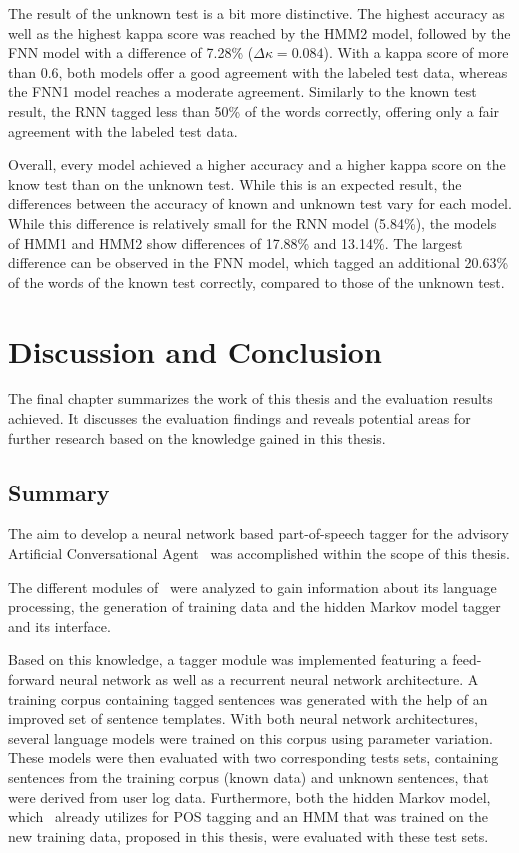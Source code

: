 The result of the unknown test is a bit more distinctive. The highest accuracy as well as the highest kappa score was reached by the HMM2 model, followed by the FNN model with a difference of 7.28\% ($\Delta\kappa=0.084$). With a kappa score of more than 0.6, both models offer a good agreement with the labeled test data, whereas the FNN1 model reaches a moderate agreement. Similarly to the known test result, the RNN tagged less than 50\% of the words correctly, offering only a fair agreement with the labeled test data.

Overall, every model achieved a higher accuracy and a higher kappa score on the know test than on the unknown test. While this is an expected result, the differences between the accuracy of known and unknown test vary for each model. While this difference is relatively small for the RNN model (5.84\%), the models of HMM1 and HMM2 show differences of 17.88\% and 13.14\%. The largest difference can be observed in the FNN model, which tagged an additional 20.63\% of the words of the known test correctly, compared to those of the unknown test.

\chapter{Discussion and Conclusion}\label{c.conclusion}
The final chapter summarizes the work of this thesis and the evaluation results achieved. It discusses the evaluation findings and reveals potential areas for further research based on the knowledge gained in this thesis.

\section{Summary}\label{c.conclusion.summary}
The aim to develop a neural network based part-of-speech tagger for the advisory Artificial Conversational Agent \Alex\ was accomplished within the scope of this thesis.

The different modules of \Alex\ were analyzed to gain information about its language processing, the generation of training data and the hidden Markov model tagger and its interface.

Based on this knowledge, a tagger module was implemented featuring a feed-forward neural network as well as a recurrent neural network architecture. A training corpus containing tagged sentences was generated with the help of an improved set of sentence templates. With both neural network architectures, several language models were trained on this corpus using parameter variation. These models were then evaluated with two corresponding tests sets, containing sentences from the training corpus (known data) and unknown sentences, that were derived from user log data. Furthermore, both the hidden Markov model, which \Alex\ already utilizes for POS tagging and an HMM that was trained on the new training data, proposed in this thesis, were evaluated with these test sets.

